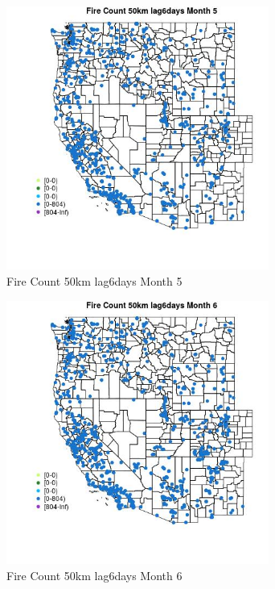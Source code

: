 \begin{figure} 
\centering  
\includegraphics[width=0.77\textwidth]{Code_Outputs/Report_ML_input_PM25_Step4_part_f_de_duplicated_aveswNAs_MapObsMo5Fire_Count_50km_lag6days.jpg} 
\caption{\label{fig:Report_ML_input_PM25_Step4_part_f_de_duplicated_aveswNAsMapObsMo5Fire_Count_50km_lag6days}Fire Count 50km lag6days Month 5} 
\end{figure} 
 

\begin{figure} 
\centering  
\includegraphics[width=0.77\textwidth]{Code_Outputs/Report_ML_input_PM25_Step4_part_f_de_duplicated_aveswNAs_MapObsMo6Fire_Count_50km_lag6days.jpg} 
\caption{\label{fig:Report_ML_input_PM25_Step4_part_f_de_duplicated_aveswNAsMapObsMo6Fire_Count_50km_lag6days}Fire Count 50km lag6days Month 6} 
\end{figure} 
 

